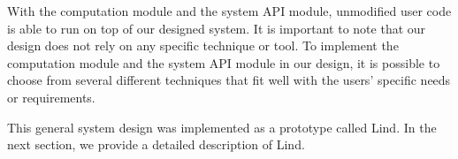 With the computation module and the system API module, unmodified user code is able to run on top of our designed system. 
It is important to note that our design does not rely on any specific technique or tool. 
To implement the computation module and the system API module in our design, 
it is possible to choose from several different techniques that fit well with the users' specific needs or requirements.

This general system design was implemented as a prototype called Lind. 
In the next section, we provide a detailed description of Lind.
